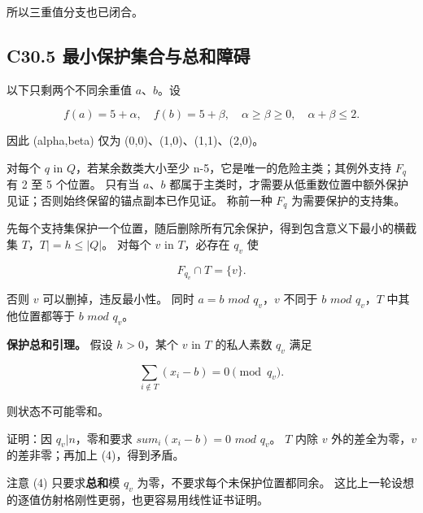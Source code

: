 {所以三重值分支也已闭合。}

\subsection*{\texorpdfstring{{C30.5} {最小保护集合与总和障碍}}{C30.5 最小保护集合与总和障碍}}\label{C30-h195}

{以下只剩两个不同余重值} {\ensuremath{a}、\ensuremath{b}。设}

\[
f(a)=5+\alpha,\quad f(b)=5+\beta,
\quad\alpha\ge\beta\ge0,\quad\alpha+\beta\le2.
\tag{C30.2}
\]

{因此} {(alpha,beta)} {仅为} {(0,0)、(1,0)、(1,1)、(2,0)。}

{对每个} {\ensuremath{q}} {in} {\ensuremath{Q}，若某余数类大小至少} {n-5，它是唯一的危险主类；其例外支持} {\ensuremath{F_{q}}} {有} {2} {至} {5} {个位置。} {只有当} {\ensuremath{a}、\ensuremath{b}} {都属于主类时，才需要从低重数位置中额外保护见证；否则始终保留的锚点副本已作见证。} {称前一种} {\ensuremath{F_{q}}} {为需要保护的支持集。}

{先每个支持集保护一个位置，随后删除所有冗余保护，得到包含意义下最小的横截集} {\ensuremath{T}，\textbar{}\ensuremath{T|=h\le |Q|}。} {对每个} {\ensuremath{v}} {in} {\ensuremath{T}，必存在} {\ensuremath{q_{v}}} {使}

\[
F_{q_v}\cap T=\{v\}.
\tag{C30.3}
\]

{否则} {\ensuremath{v}} {可以删掉，违反最小性。} {同时} {\ensuremath{a=b}} {\ensuremath{mod}} {\ensuremath{q_{v}}，\ensuremath{v}} {不同于} {\ensuremath{b}} {\ensuremath{mod}} {\ensuremath{q_{v}}，\ensuremath{T}} {中其他位置都等于} {\ensuremath{b}} {\ensuremath{mod}} {\ensuremath{q_{v}}。}

\textbf{{保护总和引理。}} {假设} {\ensuremath{h>0}，某个} {\ensuremath{v}} {in} {\ensuremath{T}} {的私人素数} {\ensuremath{q_{v}}} {满足}

\[
\sum_{i\notin T}(x_i-b)=0\pmod{q_v}.
\tag{C30.4}
\]

{则状态不可能零和。}

{证明：因} {\ensuremath{q_{v}|n}，零和要求} {\ensuremath{sum_{i}(x_{i}-b)=0}} {\ensuremath{mod}} {\ensuremath{q_{v}}。} {\ensuremath{T}} {内除} {\ensuremath{v}} {外的差全为零，\ensuremath{v}} {的差非零；再加上} {(4)，得到矛盾。}

{注意} {(4)} {只要求}\textbf{{总和}}{模} {\ensuremath{q_{v}}} {为零，不要求每个未保护位置都同余。} {这比上一轮设想的逐值仿射格刚性更弱，也更容易用线性证书证明。}

